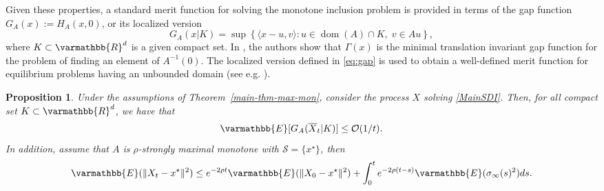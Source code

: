 \documentclass[11pt,reqno]{article}
\let\mathbb=\varmathbb
\newcommand{\R}{\mathbb{R}}
\newcommand{\gph}{\operatorname{gph}}
\newcommand{\dom}{\operatorname{dom}}
\newcommand{\1}{\mathds{1}}
\newcommand{\Aver}[2]{\overline{#1}_{#2}}
\numberwithin{equation}{section}  %
\theoremstyle{plain}
\newtheorem{proposition}[theorem]{Proposition}
\theoremstyle{definition}
\theoremstyle{remark}
\numberwithin{theorem}{section}
\numberwithin{remark}{section}
\numberwithin{example}{section}
\begin{document}
Given these properties, a standard merit function for solving the monotone inclusion problem is provided in terms of the gap function $G_A(x):=H_{A}(x,0)$, or its localized version
\begin{equation}
\label{eq:gap}
G_A(x\vert K)=\sup\left\{ \langle x-u,v\rangle : u\in\dom(A)\cap K,\; v\in Au \right\},
\end{equation}
 where $K\subset\R^{d}$ is a given compact set. In \cite{MR3575644}, the authors show that $\Gamma(x)$ is the minimal translation invariant gap function for the problem of finding an element of $A^{-1}(0)$. The localized version defined in \eqref{eq:gap} is used to obtain a well-defined merit function for equilibrium problems having an unbounded domain (see e.g. \cite{MR2295146}). 

    \begin{proposition}
    Under the assumptions of Theorem~\ref{main-thm-max-mon}, consider the process $X$ solving \eqref{MainSDI}. Then, for all compact set $K\subset \R^d$, we have  that
            \begin{equation*}
            \mathbb{E}[G_A(\Aver{X}{t}\vert K)]\leq \mathcal{O}(1/t).
            \end{equation*}
In addition, assume that $A$ is $\rho$-strongly maximal monotone with $\mathcal{S} = \{x^\star\}$, then
    		\begin{equation}\label{eqn-strong-mon-rate}
    			\mathbb{E}(\|X_t-x^\star\|^2)\leq e^{-2\rho t}\mathbb{E}(\|X_0-x^\star\|^2) + \int_0^te^{-2\rho(t-s)}\mathbb{E}(\sigma_\infty(s)^2)ds.
    		\end{equation}
    \end{proposition}
\end{document}
